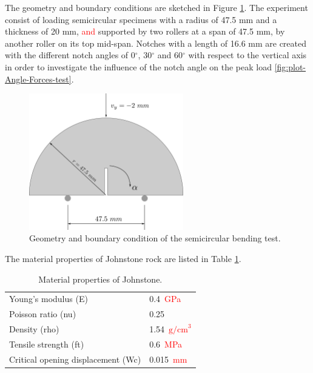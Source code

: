 \documentclass[preprint,12pt,a4paper]{elsarticle}
\begin{document}
The geometry and boundary conditions are sketched in Figure 
\ref{fig:geometry-Semicircular-bending-test}. The experiment consist of loading
semicircular specimens with a radius of 47.5 mm and a thickness of
20 mm, \textcolor{red}{and} supported by two rollers at a span of 47.5 mm, by
another roller on its top mid-span. Notches with a length of 16.6 mm are
created with the different notch angles of 0$^{\circ}$, 30$^{\circ}$ and 60$^{\circ}$ with respect
to the vertical axis in order to investigate the influence of the
notch angle on the peak load \ref{fig:plot-Angle-Forces-test}.
\begin{figure}
  \centering
  \includegraphics[width=0.6\textwidth]{./Figure-Semicircular-bending-test}
  \caption{Geometry and boundary condition of the semicircular bending
    test.}
  \label{fig:geometry-Semicircular-bending-test}
\end{figure}
The material properties of Johnstone rock are listed in Table \ref{tab:Johnstone-properties}.
\begin{table}
  \centering
  \begin{tabular}[]{l l}
    \hline
    Young's modulus (\gls{E})   & 0.4\  \textcolor{red}{GPa}       \\
    Poisson ratio (\gls{nu})    & 0.25           \\
    Density (\gls{rho})         & 1.54\ \textcolor{red}{$\text{g/cm}^3$} \\
    Tensile strength (\gls{ft}) & 0.6\ \textcolor{red}{MPa}       \\
    Critical opening displacement (\gls{Wc}) & 0.015\ \textcolor{red}{mm} \\
    \hline
  \end{tabular}
  \caption[Mechanical properties of Johnstone. ]{Material properties of Johnstone.}
  \label{tab:Johnstone-properties}
\end{table}
\end{document}
